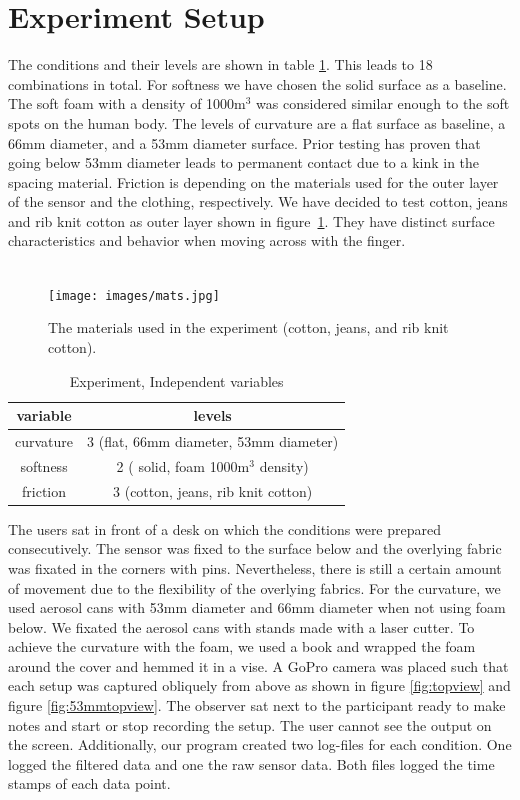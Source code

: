 \section{Experiment Setup}
The conditions and their levels are shown in table \ref{table:conditions}. This leads to 18 combinations in total. For softness we have chosen the solid surface as a baseline. The soft foam with a density of 1000m$^3$ was considered similar enough to the soft spots on the human body. The levels of curvature are a flat surface as baseline, a 66mm diameter, and a 53mm diameter surface. Prior testing has proven that going below 53mm diameter leads to permanent contact due to a kink in the spacing material. Friction is depending on the materials used for the outer layer of the sensor and the clothing, respectively. We have decided to test cotton, jeans and rib knit cotton as outer layer shown in figure~\ref{fig:mats}. They have distinct surface characteristics and behavior when moving across with the finger. \\ \\\begin{figure}
\texttt{[image: images/mats.jpg]}
\caption{The materials used in the experiment (cotton, jeans, and rib knit cotton).}
\label{fig:mats}
\end{figure}\begin{table}
\begin{tabular}{|c|c|}
  \hline
  \textbf{variable}& \textbf{levels} \\
  \hline
  curvature & 3 (flat, 66mm diameter, 53mm diameter) \\
  \hline
  softness &2 ( solid, foam 1000m$^3$ density) \\
  \hline
  friction & 3 (cotton, jeans, rib knit cotton) \\
  \hline
\end{tabular}
\caption{Experiment, Independent variables}
\label{table:conditions}
\end{table}The users sat in front of a desk on which the conditions were prepared consecutively. The sensor was fixed to the surface below and the overlying fabric was fixated in the corners with pins. Nevertheless, there is still a certain amount of movement due to the flexibility of the overlying fabrics. For the curvature, we used aerosol cans with 53mm diameter and 66mm diameter when not using foam below. We fixated the aerosol cans with stands made with a laser cutter. To achieve the curvature with the foam, we used a book and wrapped the foam around the cover and hemmed it in a vise. A GoPro camera was placed such that each setup was captured obliquely from above as shown in figure \ref{fig:topview} and figure \ref{fig:53mmtopview}. The observer sat next to the participant ready to make notes and start or stop recording the setup. The user cannot see the output on the screen. Additionally, our program created two log-files for each condition. One logged the filtered data and one the raw sensor data. Both files logged the time stamps of each data point.\\ \\\begin{figure}

\end{figure}
